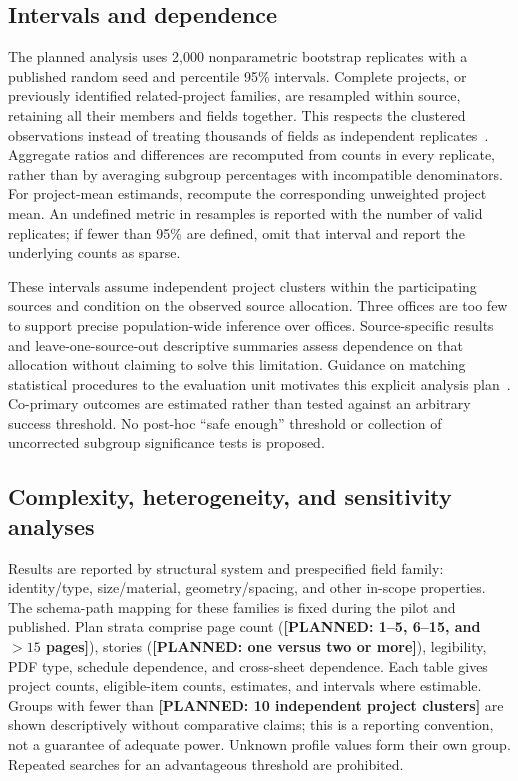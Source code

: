 \documentclass[11pt]{article}
\newcommand{\planned}[1]{\textcolor{blue!65!black}{\textbf{[PLANNED: #1]}}}
\begin{document}
\subsection{Intervals and dependence}
The planned analysis uses 2,000 nonparametric bootstrap replicates with a published random seed and percentile 95\% intervals. Complete projects, or previously identified related-project families, are resampled within source, retaining all their members and fields together. This respects the clustered observations instead of treating thousands of fields as independent replicates~\cite{field2007}. Aggregate ratios and differences are recomputed from counts in every replicate, rather than by averaging subgroup percentages with incompatible denominators. For project-mean estimands, recompute the corresponding unweighted project mean. An undefined metric in resamples is reported with the number of valid replicates; if fewer than 95\% are defined, omit that interval and report the underlying counts as sparse.

These intervals assume independent project clusters within the participating sources and condition on the observed source allocation. Three offices are too few to support precise population-wide inference over offices. Source-specific results and leave-one-source-out descriptive summaries assess dependence on that allocation without claiming to solve this limitation. Guidance on matching statistical procedures to the evaluation unit motivates this explicit analysis plan~\cite{dror2018}. Co-primary outcomes are estimated rather than tested against an arbitrary success threshold. No post-hoc ``safe enough'' threshold or collection of uncorrected subgroup significance tests is proposed.

\subsection{Complexity, heterogeneity, and sensitivity analyses}
Results are reported by structural system and prespecified field family: identity/type, size/material, geometry/spacing, and other in-scope properties. The schema-path mapping for these families is fixed during the pilot and published. Plan strata comprise page count (\planned{1--5, 6--15, and $>15$ pages}), stories (\planned{one versus two or more}), legibility, PDF type, schedule dependence, and cross-sheet dependence. Each table gives project counts, eligible-item counts, estimates, and intervals where estimable. Groups with fewer than \planned{10 independent project clusters} are shown descriptively without comparative claims; this is a reporting convention, not a guarantee of adequate power. Unknown profile values form their own group. Repeated searches for an advantageous threshold are prohibited.
\end{document}
